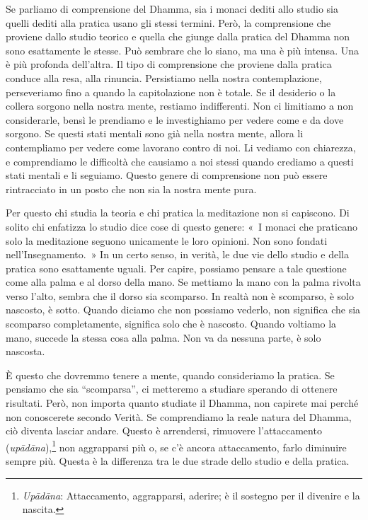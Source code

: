Se parliamo di comprensione del Dhamma, sia i monaci dediti allo studio
sia quelli dediti alla pratica usano gli stessi termini. Però, la
comprensione che proviene dallo studio teorico e quella che giunge dalla
pratica del Dhamma non sono esattamente le stesse. Può sembrare che lo
siano, ma una è più intensa. Una è più profonda dell'altra. Il tipo di
comprensione che proviene dalla pratica conduce alla resa, alla
rinuncia. Persistiamo nella nostra contemplazione, perseveriamo fino a
quando la capitolazione non è totale. Se il desiderio o la collera
sorgono nella nostra mente, restiamo indifferenti. Non ci limitiamo a
non considerarle, bensì le prendiamo e le investighiamo per vedere come
e da dove sorgono. Se questi stati mentali sono già nella nostra mente,
allora li contempliamo per vedere come lavorano contro di noi. Li
vediamo con chiarezza, e comprendiamo le difficoltà che causiamo a noi
stessi quando crediamo a questi stati mentali e li seguiamo. Questo
genere di comprensione non può essere rintracciato in un posto che non
sia la nostra mente pura.

Per questo chi studia la teoria e chi pratica la meditazione non si
capiscono. Di solito chi enfatizza lo studio dice cose di questo genere:
«~I monaci che praticano solo la meditazione seguono unicamente le loro
opinioni. Non sono fondati nell'Insegnamento.~» In un certo senso, in
verità, le due vie dello studio e della pratica sono esattamente uguali.
Per capire, possiamo pensare a tale questione come alla palma e al dorso
della mano. Se mettiamo la mano con la palma rivolta verso l'alto,
sembra che il dorso sia scomparso. In realtà non è scomparso, è solo
nascosto, è sotto. Quando diciamo che non possiamo vederlo, non
significa che sia scomparso completamente, significa solo che è
nascosto. Quando voltiamo la mano, succede la stessa cosa alla palma.
Non va da nessuna parte, è solo nascosta.

È questo che dovremmo tenere a mente, quando consideriamo la pratica. Se
pensiamo che sia ``scomparsa'', ci metteremo a studiare sperando di
ottenere risultati. Però, non importa quanto studiate il Dhamma, non
capirete mai perché non conoscerete secondo Verità. Se comprendiamo la
reale natura del Dhamma, ciò diventa lasciar andare. Questo è
arrendersi, rimuovere l'attaccamento (\emph{upādāna}),\footnote{\emph{Upādāna}:
  Attaccamento, aggrapparsi, aderire; è il sostegno per il divenire e la
  nascita.} non aggrapparsi più o, se c'è ancora attaccamento, farlo
diminuire sempre più. Questa è la differenza tra le due strade dello
studio e della pratica.

